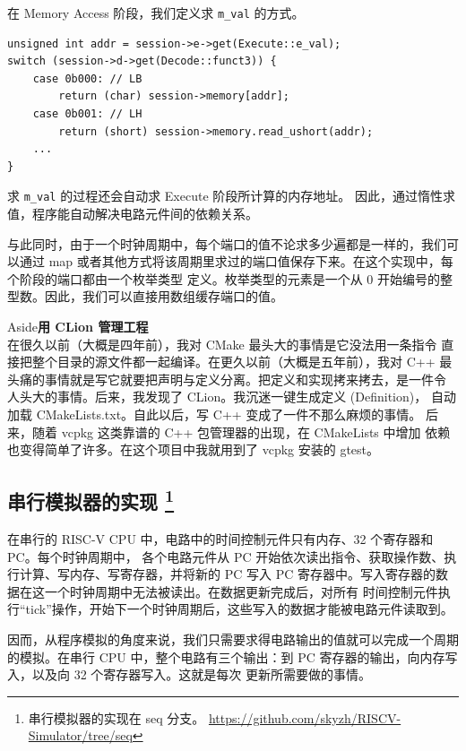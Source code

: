 \documentclass[12pt]{article}
\newenvironment{aside}[1]
    { \begin{tcolorbox}[enlarge top by=0.5cm, enlarge bottom by=0.5cm] Aside\space\space\space\space \textbf{#1} \\
        } { \end{tcolorbox} }
\begin{document}
    在 Memory Access 阶段，我们定义求 \texttt{m\_val} 的方式。

    \begin{verbatim}
unsigned int addr = session->e->get(Execute::e_val);
switch (session->d->get(Decode::funct3)) {
    case 0b000: // LB
        return (char) session->memory[addr];
    case 0b001: // LH
        return (short) session->memory.read_ushort(addr);
    ...
}
    \end{verbatim}

    求 \texttt{m\_val} 的过程还会自动求 Execute 阶段所计算的内存地址。
    因此，通过惰性求值，程序能自动解决电路元件间的依赖关系。

    与此同时，由于一个时钟周期中，每个端口的值不论求多少遍都是一样的，我们可以通过 map
    或者其他方式将该周期里求过的端口值保存下来。在这个实现中，每个阶段的端口都由一个枚举类型
    定义。枚举类型的元素是一个从 0 开始编号的整型数。因此，我们可以直接用数组缓存端口的值。
    
    \begin{aside}{用 CLion 管理工程}
        在很久以前（大概是四年前），我对 CMake 最头大的事情是它没法用一条指令
        直接把整个目录的源文件都一起编译。在更久以前（大概是五年前），我对 C++
        最头痛的事情就是写它就要把声明与定义分离。把定义和实现拷来拷去，是一件令
        人头大的事情。后来，我发现了 CLion。我沉迷一键生成定义 (Definition)，
        自动加载 CMakeLists.txt。自此以后，写 C++ 变成了一件不那么麻烦的事情。
        后来，随着 vcpkg 这类靠谱的 C++ 包管理器的出现，在 CMakeLists 中增加
        依赖也变得简单了许多。在这个项目中我就用到了 vcpkg 安装的 gtest。
    \end{aside}

    \subsection{串行模拟器的实现\protect
        \footnote{串行模拟器的实现在 seq 分支。
        \url{https://github.com/skyzh/RISCV-Simulator/tree/seq}}}

    在串行的 RISC-V CPU 中，电路中的时间控制元件只有内存、32 个寄存器和 PC。每个时钟周期中，
    各个电路元件从 PC 开始依次读出指令、获取操作数、执行计算、写内存、写寄存器，并将新的 PC
    写入 PC 寄存器中。写入寄存器的数据在这一个时钟周期中无法被读出。在数据更新完成后，对所有
    时间控制元件执行``tick''操作，开始下一个时钟周期后，这些写入的数据才能被电路元件读取到。

    因而，从程序模拟的角度来说，我们只需要求得电路输出的值就可以完成一个周期的模拟。在串行 CPU
    中，整个电路有三个输出：到 PC 寄存器的输出，向内存写入，以及向 32 个寄存器写入。这就是每次
    更新所需要做的事情。
\end{document}
